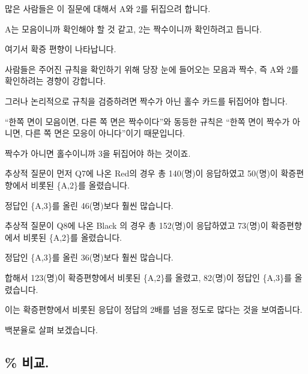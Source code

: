 \documentclass[
]{book}
\begin{document}
많은 사람들은 이 질문에 대해서 A와 2를 뒤집으려 합니다.

A는 모음이니까 확인해야 할 것 같고, 2는 짝수이니까 확인하려고 듭니다.

여기서 확증 편향이 나타납니다.

사람들은 주어진 규칙을 확인하기 위해 당장 눈에 들어오는 모음과 짝수, 즉 A와 2를 확인하려는 경향이 강합니다.

그러나 논리적으로 규칙을 검증하려면 짝수가 아닌 홀수 카드를 뒤집어야 합니다.

``한쪽 면이 모음이면, 다른 쪽 면은 짝수이다''와 동등한 규칙은 ``한쪽 면이 짝수가 아니면, 다른 쪽 면은 모응이 아니다''이기 때문입니다.

짝수가 아니면 홀수이니까 3을 뒤집어야 하는 것이죠.

추상적 질문이 먼저 Q7에 나온 Red의 경우 총 140(명)이 응답하였고 50(명)이 확증편향에서 비롯된 \{A,2\}를 올렸습니다.

정답인 \{A,3\}를 올린 46(명)보다 훨씬 많습니다.

추상적 질문이 Q8에 나온 Black 의 경우 총 152(명)이 응답하였고 73(명)이 확증편향에서 비롯된 \{A,2\}를 올렸습니다.

정답인 \{A,3\}를 올린 36(명)보다 훨씬 많습니다.

합해서 123(명)이 확증편향에서 비롯된 \{A,2\}를 올렸고, 82(명)이 정답인 \{A,3\}를 올렸습니다.

이는 확증편향에서 비롯된 응답이 정답의 2배를 넘을 정도로 많다는 것을 보여줍니다.

백분율로 살펴 보겠습니다.

\subsection{\% 비교.}\label{uxbe44uxad50.-4}
\end{document}

